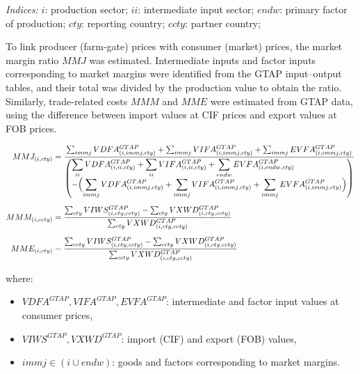 \textit{Indices:}  
\( i \): production sector;  
\( ii \): intermediate input sector;  
\( endw \): primary factor of production;  
\( cty \): reporting country;  
\( ccty \): partner country;  

\bigskip

To link producer (farm-gate) prices with consumer (market) prices, 
the market margin ratio \( MMJ \) was estimated.  
Intermediate inputs and factor inputs corresponding to market margins 
were identified from the GTAP input–output tables, 
and their total was divided by the production value to obtain the ratio.  
Similarly, trade-related costs \( MMM \) and \( MME \) were estimated from GTAP data,  
using the difference between import values at CIF prices and export values at FOB prices.

\begin{align}
MMJ_{(i,cty)}
&=
\frac{
  \sum_{immj} VDFA^{GTAP}_{(i,immj,cty)}
  + \sum_{immj} VIFA^{GTAP}_{(i,immj,cty)}
  + \sum_{immj} EVFA^{GTAP}_{(i,immj,cty)}
}{
  \left(
  \begin{array}{@{}l@{}}
    \displaystyle
    \sum_{ii} VDFA^{GTAP}_{(i,ii,cty)}
    + \sum_{ii} VIFA^{GTAP}_{(i,ii,cty)}
    + \sum_{endw} EVFA^{GTAP}_{(i,endw,cty)} \\[0.2em]
    \displaystyle
    - \Bigl(
        \sum_{immj} VDFA^{GTAP}_{(i,immj,cty)}
      + \sum_{immj} VIFA^{GTAP}_{(i,immj,cty)}
      + \sum_{immj} EVFA^{GTAP}_{(i,immj,cty)}
      \Bigr)
  \end{array}
  \right)
}
\\[0.5em]
MMM_{(i,ccty)}
&=
\frac{
  \sum_{cty} VIWS^{GTAP}_{(i,cty,ccty)}
  - \sum_{cty} VXWD^{GTAP}_{(i,cty,ccty)}
}{
  \sum_{cty} VXWD^{GTAP}_{(i,cty,ccty)}
}
\\[0.5em]
MME_{(i,cty)}
&=
\frac{
  \sum_{ccty} VIWS^{GTAP}_{(i,cty,ccty)}
  - \sum_{ccty} VXWD^{GTAP}_{(i,cty,ccty)}
}{
  \sum_{ccty} VXWD^{GTAP}_{(i,cty,ccty)}
}
\end{align}


where:
\begin{itemize}
\item \( VDFA^{GTAP}, VIFA^{GTAP}, EVFA^{GTAP} \): intermediate and factor input values at consumer prices,  
\item \( VIWS^{GTAP}, VXWD^{GTAP} \): import (CIF) and export (FOB) values,  
\item \( immj \in (i \cup endw) \): goods and factors corresponding to market margins.
\end{itemize}

